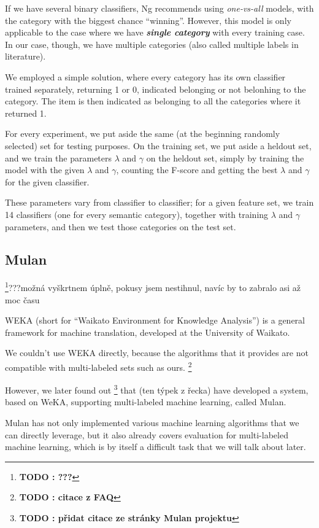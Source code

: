 \documentclass[letterpaper]{article}
\newcommand{\todofn}[1] {
 \footnote{\textbf{TODO : #1}}}
\begin{document}
If we have several binary classifiers, Ng recommends using \emph{one-vs-all} models, with the category with the biggest chance ``winning''. However, this model is only applicable to the case where we have \textbf{\emph{single category}} with every training case. 
In our case, though, we have multiple categories (also called multiple labels in literature). 

We employed a simple solution, where every category has its own classifier trained separately, returning 1 or 0, indicated 
belonging or not belonhing to the category. The item is then indicated as belonging to all the categories where it returned 1.

For every experiment, we put aside the same (at the beginning randomly selected) set for testing purposes. 
On the training set, we put aside a heldout set, and we train the parameters $\lambda$ and $\gamma$ on the heldout set, simply by training the model with the given $\lambda$ and $\gamma$, counting the F-score and getting the best $\lambda$ and $\gamma$ for the given classifier.

These parameters vary from classifier to classifier; for a given feature set, we train 14 classifiers (one for every semantic category), together with training $\lambda$ and $\gamma$ parameters, and then we test those categories on the test set.

\subsection{Mulan}
\todofn{???}???možná vyškrtnem úplně, pokusy jsem nestihnul, navíc by to zabralo asi až moc času

WEKA (short for ``Waikato Environment for Knowledge Analysis'') is a general framework for machine translation, developed at the University of Waikato.

We couldn't use WEKA directly, because the algorithms that it provides are not compatible with multi-labeled sets such as ours. \todofn{citace z FAQ}

However, we later found out \todofn{přidat citace ze stránky Mulan projektu} that (ten týpek z řecka) have developed a system, 
based on WeKA, supporting multi-labeled machine learning, called Mulan.

Mulan has not only implemented various machine learning algorithms that we can directly leverage, but it also already 
covers evaluation for multi-labeled machine learning, which is by itself a difficult task that we will talk about later.
\end{document}
